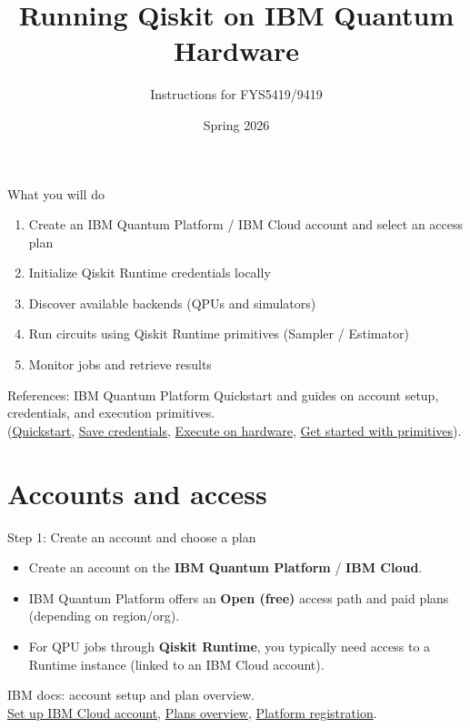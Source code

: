 \documentclass{beamer}
\title{Running Qiskit on IBM Quantum Hardware}
\author{Instructions for FYS5419/9419}
\date{Spring 2026}
\begin{document}
\begin{frame}
\titlepage
\end{frame}

\begin{frame}{What you will do}
\begin{enumerate}
  \item Create an IBM Quantum Platform / IBM Cloud account and select an access plan
  \item Initialize Qiskit Runtime credentials locally
  \item Discover available backends (QPUs and simulators)
  \item Run circuits using Qiskit Runtime primitives (Sampler / Estimator)
  \item Monitor jobs and retrieve results
\end{enumerate}

\vspace{0.4em}
\scriptsize
References: IBM Quantum Platform Quickstart and guides on account setup, credentials, and execution primitives. \\
(\href{https://quantum.cloud.ibm.com/docs/guides/quick-start}{Quickstart},
\href{https://quantum.cloud.ibm.com/docs/guides/save-credentials}{Save credentials},
\href{https://quantum.cloud.ibm.com/docs/guides/execute-on-hardware}{Execute on hardware},
\href{https://quantum.cloud.ibm.com/docs/guides/get-started-with-primitives}{Get started with primitives}).%
\end{frame}

\section{Accounts and access}

\begin{frame}{Step 1: Create an account and choose a plan}
\begin{itemize}
  \item Create an account on the \textbf{IBM Quantum Platform} / \textbf{IBM Cloud}.
  \item IBM Quantum Platform offers an \textbf{Open (free)} access path and paid plans (depending on region/org).%
  \item For QPU jobs through \textbf{Qiskit Runtime}, you typically need access to a Runtime instance (linked to an IBM Cloud account).
\end{itemize}

\vspace{0.4em}
\scriptsize
IBM docs: account setup and plan overview.\\
\href{https://quantum.cloud.ibm.com/docs/guides/cloud-setup}{Set up IBM Cloud account},
\href{https://quantum.cloud.ibm.com/docs/guides/plans-overview}{Plans overview},
\href{https://quantum.cloud.ibm.com/registration}{Platform registration}.%
\end{frame}
\end{document}
